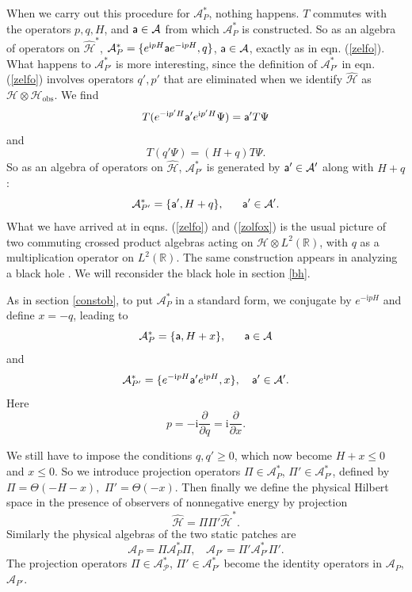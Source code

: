 \documentclass[11pt,a4paper]{article}
\def\a{{\sf a}}
\def\be{\begin{equation}}
\def\ee{\end{equation}}
\def\h{\widehat}
\def\A{{\mathcal A}}
\def\R{{\mathbb R}}
\def\h{\widehat}
\def\P{{\mathcal P}}
\def\H{{\mathcal H}}
\def\obs{{\mathrm{obs}}}
\def\i{{\mathrm i}}
\begin{document}
When we carry out this procedure for $\A_P^*$, nothing happens.   $T$ commutes with the operators $p,q,H$, and $\a\in \A$ from which $\A_P^*$ is constructed.   So
as an algebra of operators on $\h\H^*$, $\A_P^*=\{e^{\i p H}\a e^{-\i p H},q\}$, $\a\in\A$,  exactly as in eqn. (\ref{zelfo}).    
What happens to $\A_{P'}^*$ is more interesting, since the definition of $\A_{P'}^*$ in eqn. (\ref{zelfo}) involves operators $q',p'$ that are eliminated when we identify
$\h\H$ as $\H\otimes \H_\obs$.
We find
\be\label{motlo}   T(e^{-\i p' H}\a' {e^{\i p' H}}\Psi)=\a' T\Psi\ee
and
\be\label{golfox} T(q'\Psi) = (H+q) T\Psi. \ee
So as an algebra of operators on $\h \H$, $\A_{P'}^*$ is generated by  $\a'\in \A'$ along with $H+q$:
\be\label{zolfox} \A_{P'}^*=\{\a',H+q\},~~~~~   \a'\in\A'. \ee
What we have arrived at in eqns. (\ref{zelfo}) and (\ref{zolfox}) is the usual picture of two commuting crossed product algebras acting on $\H\otimes L^2(\R)$,
with $q$ as a multiplication operator on $L^2(\R)$.  The same construction appears in analyzing a black hole \cite{GCP}.
We will reconsider the black hole in section \ref{bh}. 

As in section \ref{constob}, to put $\A_P^*$ in a standard form, we conjugate by $e^{-\i p H}$ and  define $x=-q$, leading to
\be\label{firstalg} \A_P^*=\{ \a, H+x\},~~~~~\a\in \A\ee
and
\be\label{secondalg}\A_{P'}^* =\{ e^{-\i p H}\a' e^{\i p H}, x\},~~~\a'\in\A'.\ee
Here
\be\label{welco}p=-\i\frac{\partial}{\partial q}=\i\frac{\partial}{\partial x}. \ee

We still have to impose the conditions $q,q'\geq 0$, which now become $H+x\leq 0 $ and $x\leq 0$. So we introduce projection operators 
$\Pi\in \A_P^*$, $\Pi'\in \A_{P'}^*$, defined by $\Pi=\Theta(-H-x), $   $\Pi'=\Theta(-x)$.   Then finally we define the physical Hilbert space 
in the presence of observers of nonnegative energy by projection
\be\label{proj} \h\H=\Pi\Pi'\h\H^*.\ee
   Similarly the physical algebras of the two static patches are
 \be\label{noj}
   \A_P=\Pi \A_P^*\Pi,~~~~\A_{P'}=\Pi'\A_{P'}^*\Pi'.\ee   The projection operators $\Pi\in\A_\P^*$, $\Pi'\in\A_{P'}^*$ become the identity operators
   in $\A_P$, $\A_{P'}$.
\end{document}
